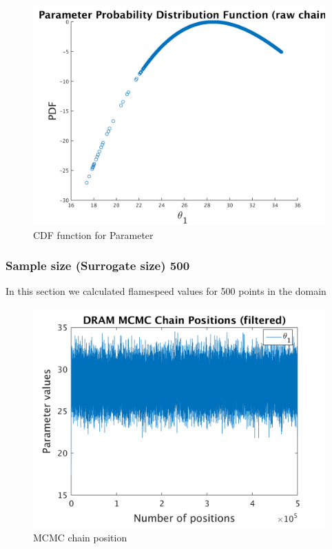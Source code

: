 \begin{figure}[H]
  
  \centering
   \includegraphics[scale=0.75]{53_results/output_100/ip_logLike_unified}
   \caption{CDF function for Parameter }
\end{figure}


\subsubsection{Sample size (Surrogate size) 500 }

In this section we calculated flamespeed values for 500 points in the domain 

\begin{figure}[H]
  
  \centering
   \includegraphics[scale=0.75]{53_results/output_500/simple_ip_chain_pos_filt}
   \caption{MCMC chain position }
\end{figure}


